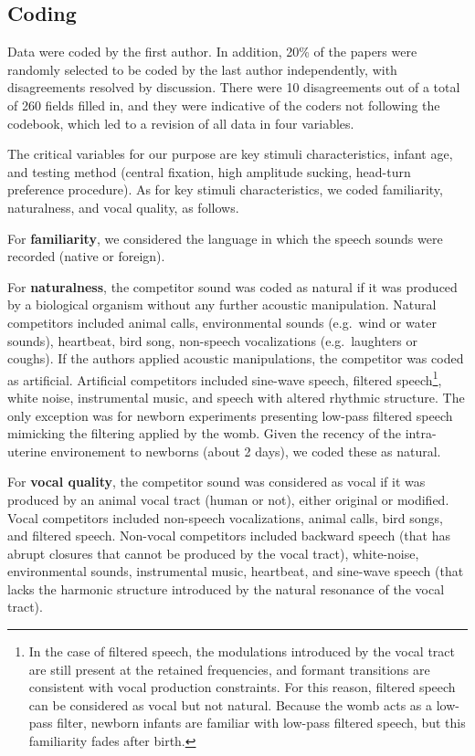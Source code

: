 \documentclass[
  man]{apa6}
\begin{document}
\hypertarget{coding}{%
\subsection{Coding}\label{coding}}

Data were coded by the first author. In addition, 20\% of the papers were randomly selected to be coded by the last author independently, with disagreements resolved by discussion. There were 10 disagreements out of a total of 260 fields filled in, and they were indicative of the coders not following the codebook, which led to a revision of all data in four variables.

The critical variables for our purpose are key stimuli characteristics, infant age, and testing method (central fixation, high amplitude sucking, head-turn preference procedure). As for key stimuli characteristics, we coded familiarity, naturalness, and vocal quality, as follows.

For \textbf{familiarity}, we considered the language in which the speech sounds were recorded (native or foreign).

For \textbf{naturalness}, the competitor sound was coded as natural if it was produced by a biological organism without any further acoustic manipulation. Natural competitors included animal calls, environmental sounds (e.g.~wind or water sounds), heartbeat, bird song, non-speech vocalizations (e.g.~laughters or coughs). If the authors applied acoustic manipulations, the competitor was coded as artificial. Artificial competitors included sine-wave speech, filtered speech\footnote{In the case of filtered speech, the modulations introduced by the vocal tract are still present at the retained frequencies, and formant transitions are consistent with vocal production constraints. For this reason, filtered speech can be considered as vocal but not natural. Because the womb acts as a low-pass filter, newborn infants are familiar with low-pass filtered speech, but this familiarity fades after birth.}, white noise, instrumental music, and speech with altered rhythmic structure. The only exception was for newborn experiments presenting low-pass filtered speech mimicking the filtering applied by the womb. Given the recency of the intra-uterine environement to newborns (about 2 days), we coded these as natural.

For \textbf{vocal quality}, the competitor sound was considered as vocal if it was produced by an animal vocal tract (human or not), either original or modified. Vocal competitors included non-speech vocalizations, animal calls, bird songs, and filtered speech. Non-vocal competitors included backward speech (that has abrupt closures that cannot be produced by the vocal tract), white-noise, environmental sounds, instrumental music, heartbeat, and sine-wave speech (that lacks the harmonic structure introduced by the natural resonance of the vocal tract).
\end{document}
